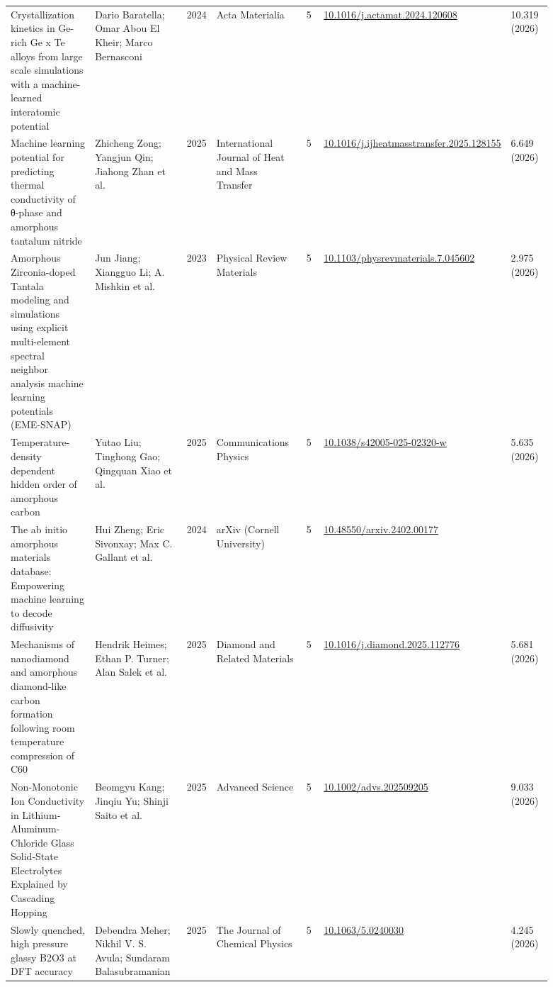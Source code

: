 \documentclass[10pt,a4paper]{article}
\begin{document}
{\begin{longtable}{p{0.192\linewidth}p{0.192\linewidth}p{0.043\linewidth}p{0.192\linewidth}p{0.043\linewidth}p{0.132\linewidth}p{0.096\linewidth}}
Crystallization kinetics in Ge-rich Ge x Te alloys from large scale simulations with a machine-learned interatomic potential & Dario Baratella; Omar Abou El Kheir; Marco Bernasconi & 2024 & Acta Materialia & 5 & \href{https://doi.org/10.1016/j.actamat.2024.120608}{10.1016/j.actamat.2024.120608} & 10.319 (2026) \\
Machine learning potential for predicting thermal conductivity of θ-phase and amorphous tantalum nitride & Zhicheng Zong; Yangjun Qin; Jiahong Zhan et al. & 2025 & International Journal of Heat and Mass Transfer & 5 & \href{https://doi.org/10.1016/j.ijheatmasstransfer.2025.128155}{10.1016/j.ijheatmasstransfer.2025.128155} & 6.649 (2026) \\
Amorphous Zirconia-doped Tantala modeling and simulations using explicit multi-element spectral neighbor analysis machine learning potentials (EME-SNAP) & Jun Jiang; Xiangguo Li; A. Mishkin et al. & 2023 & Physical Review Materials & 5 & \href{https://doi.org/10.1103/physrevmaterials.7.045602}{10.1103/physrevmaterials.7.045602} & 2.975 (2026) \\
Temperature-density dependent hidden order of amorphous carbon & Yutao Liu; Tinghong Gao; Qingquan Xiao et al. & 2025 & Communications Physics & 5 & \href{https://doi.org/10.1038/s42005-025-02320-w}{10.1038/s42005-025-02320-w} & 5.635 (2026) \\
The ab initio amorphous materials database: Empowering machine learning to decode diffusivity & Hui Zheng; Eric Sivonxay; Max C. Gallant et al. & 2024 & arXiv (Cornell University) & 5 & \href{https://doi.org/10.48550/arxiv.2402.00177}{10.48550/arxiv.2402.00177} &  \\
Mechanisms of nanodiamond and amorphous diamond-like carbon formation following room temperature compression of C60 & Hendrik Heimes; Ethan P. Turner; Alan Salek et al. & 2025 & Diamond and Related Materials & 5 & \href{https://doi.org/10.1016/j.diamond.2025.112776}{10.1016/j.diamond.2025.112776} & 5.681 (2026) \\
Non‐Monotonic Ion Conductivity in Lithium‐Aluminum‐Chloride Glass Solid‐State Electrolytes Explained by Cascading Hopping & Beomgyu Kang; Jinqiu Yu; Shinji Saito et al. & 2025 & Advanced Science & 5 & \href{https://doi.org/10.1002/advs.202509205}{10.1002/advs.202509205} & 9.033 (2026) \\
Slowly quenched, high pressure glassy B2O3 at DFT accuracy & Debendra Meher; Nikhil V. S. Avula; Sundaram Balasubramanian & 2025 & The Journal of Chemical Physics & 5 & \href{https://doi.org/10.1063/5.0240030}{10.1063/5.0240030} & 4.245 (2026) \\

\end{longtable}}
\end{document}
